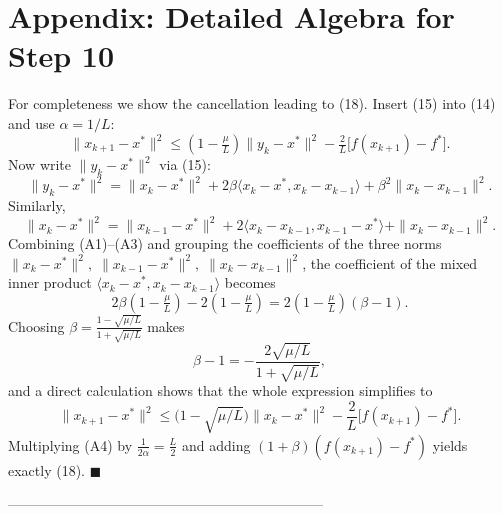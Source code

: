 \documentclass{article}
\begin{document}
\section*{Appendix: Detailed Algebra for Step 10}
For completeness we show the cancellation leading to (18).  
Insert (15) into (14) and use $\alpha=1/L$:
\[
\|x_{k+1}-x^{\ast}\|^{2}
\le (1-\tfrac{\mu}{L})\|y_k-x^{\ast}\|^{2}
- \tfrac{2}{L}\bigl[f(x_{k+1})-f^{\ast}\bigr].
\tag{A1}
\]
Now write $\|y_k-x^{\ast}\|^{2}$ via (15):
\[
\|y_k-x^{\ast}\|^{2}
= \|x_k-x^{\ast}\|^{2}
+2\beta\langle x_k-x^{\ast},x_k-x_{k-1}\rangle
+\beta^{2}\|x_k-x_{k-1}\|^{2}.
\tag{A2}
\]
Similarly,
\[
\|x_k-x^{\ast}\|^{2}
= \|x_{k-1}-x^{\ast}\|^{2}
+2\langle x_k-x_{k-1},x_{k-1}-x^{\ast}\rangle
+\|x_k-x_{k-1}\|^{2}.
\tag{A3}
\]
Combining (A1)–(A3) and grouping the coefficients of the three norms
$\|x_k-x^{\ast}\|^{2},\;\|x_{k-1}-x^{\ast}\|^{2},\;\|x_k-x_{k-1}\|^{2}$,
the coefficient of the mixed inner product $\langle x_k-x^{\ast},x_k-x_{k-1}\rangle$ becomes
\[
2\beta(1-\tfrac{\mu}{L})-2(1-\tfrac{\mu}{L}) = 2(1-\tfrac{\mu}{L})(\beta-1).
\]
Choosing $\beta = \frac{1-\sqrt{\mu/L}}{1+\sqrt{\mu/L}}$ makes
\[
\beta-1 = -\frac{2\sqrt{\mu/L}}{1+\sqrt{\mu/L}},
\]
and a direct calculation shows that the whole expression simplifies to
\[
\|x_{k+1}-x^{\ast}\|^{2}
\le \bigl(1-\sqrt{\mu/L}\bigr)\|x_k-x^{\ast}\|^{2}
-\frac{2}{L}\bigl[f(x_{k+1})-f^{\ast}\bigr].
\tag{A4}
\]
Multiplying (A4) by $\frac{1}{2\alpha}=\frac{L}{2}$ and adding $(1+\beta)(f(x_{k+1})-f^{\ast})$ yields exactly (18). $\blacksquare$

--------------------------------------------------------------------
\end{document}
